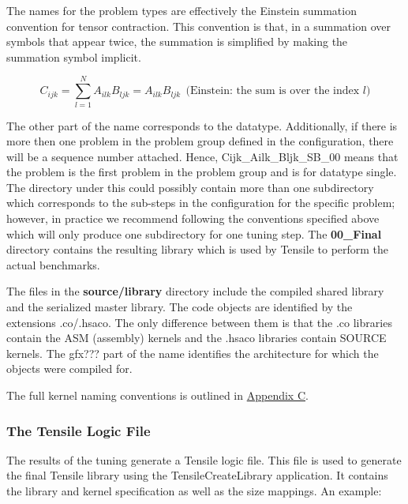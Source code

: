 \documentclass[]{article}
\begin{document}
\noindent
The names for the problem types are effectively the Einstein summation convention for tensor contraction. This convention is that, in a summation over symbols that appear twice, the summation is simplified by making the summation symbol implicit.  

\[ C_{ijk} = \sum_{l=1}^{N} A_{ilk} B_{ljk} = A_{ilk} B_{ljk}\ \ \text{(Einstein: the sum is over the index $l$)}\]

The other part of the name corresponds to the datatype. Additionally, if there is more then one problem in the problem group defined in the configuration, there will be a sequence number attached. Hence, Cijk\_Ailk\_Bljk\_SB\_00 means that the problem is the first problem in the problem group and is for datatype single. The directory under this could possibly contain more than one subdirectory which corresponds to the sub-steps in the configuration for the specific problem; however, in practice we recommend following the conventions specified above which will only produce one subdirectory for one tuning step. The \textbf{00\_Final} directory contains the resulting library which is used by Tensile to perform the actual benchmarks. 

The files in the \textbf{source/library} directory include the compiled shared library and the serialized master library. The code objects are identified by the extensions .co/.hsaco. The only difference between them is that the .co libraries contain the ASM (assembly) kernels and the .hsaco libraries contain SOURCE kernels. The gfx??? part of the name identifies the architecture for which the objects were compiled for.

The full kernel naming conventions is outlined in \hyperref[sec:appendixC]{Appendix C}.


\subsubsection{The Tensile Logic File}
\label{sec:logicFile}


The results of the tuning generate a Tensile logic file. This file is used to generate the final Tensile library using the TensileCreateLibrary application. It contains the library and kernel specification as well as the size mappings. An example:
\end{document}
